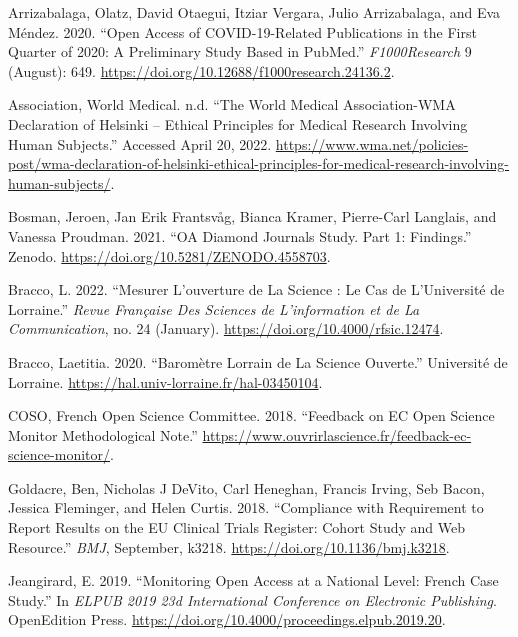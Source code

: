\documentclass[
]{article}
\newlength{\cslhangindent}
\newenvironment{cslreferences}%
  {\setlength{\parindent}{0pt}%
  \everypar{\setlength{\hangindent}{\cslhangindent}}\ignorespaces}%
  {\par}
\begin{document}
\hypertarget{refs}{}
\begin{cslreferences}
\leavevmode\hypertarget{ref-arrizabalaga_open_2020}{}%
Arrizabalaga, Olatz, David Otaegui, Itziar Vergara, Julio Arrizabalaga,
and Eva Méndez. 2020. ``Open Access of COVID-19-Related Publications in
the First Quarter of 2020: A Preliminary Study Based in PubMed.''
\emph{F1000Research} 9 (August): 649.
\url{https://doi.org/10.12688/f1000research.24136.2}.

\leavevmode\hypertarget{ref-world_medical_association_world_nodate}{}%
Association, World Medical. n.d. ``The World Medical Association-WMA
Declaration of Helsinki -- Ethical Principles for Medical Research
Involving Human Subjects.'' Accessed April 20, 2022.
\url{https://www.wma.net/policies-post/wma-declaration-of-helsinki-ethical-principles-for-medical-research-involving-human-subjects/}.

\leavevmode\hypertarget{ref-bosman_jeroen_oa_2021}{}%
Bosman, Jeroen, Jan Erik Frantsvåg, Bianca Kramer, Pierre-Carl Langlais,
and Vanessa Proudman. 2021. ``OA Diamond Journals Study. Part 1:
Findings.'' Zenodo. \url{https://doi.org/10.5281/ZENODO.4558703}.

\leavevmode\hypertarget{ref-bracco_mesurer_2022}{}%
Bracco, L. 2022. ``Mesurer L'ouverture de La Science : Le Cas de
L'Université de Lorraine.'' \emph{Revue Française Des Sciences de
L'information et de La Communication}, no. 24 (January).
\url{https://doi.org/10.4000/rfsic.12474}.

\leavevmode\hypertarget{ref-bracco:hal-03450104v1}{}%
Bracco, Laetitia. 2020. ``Baromètre Lorrain de La Science Ouverte.''
Université de Lorraine. \url{https://hal.univ-lorraine.fr/hal-03450104}.

\leavevmode\hypertarget{ref-coso_feedback_2018}{}%
COSO, French Open Science Committee. 2018. ``Feedback on EC Open Science
Monitor Methodological Note.''
\url{https://www.ouvrirlascience.fr/feedback-ec-science-monitor/}.

\leavevmode\hypertarget{ref-goldacre_compliance_2018}{}%
Goldacre, Ben, Nicholas J DeVito, Carl Heneghan, Francis Irving, Seb
Bacon, Jessica Fleminger, and Helen Curtis. 2018. ``Compliance with
Requirement to Report Results on the EU Clinical Trials Register: Cohort
Study and Web Resource.'' \emph{BMJ}, September, k3218.
\url{https://doi.org/10.1136/bmj.k3218}.

\leavevmode\hypertarget{ref-jeangirard_monitoring_2019}{}%
Jeangirard, E. 2019. ``Monitoring Open Access at a National Level:
French Case Study.'' In \emph{ELPUB 2019 23d International Conference on
Electronic Publishing}. OpenEdition Press.
\url{https://doi.org/10.4000/proceedings.elpub.2019.20}.


\end{cslreferences}
\end{document}
